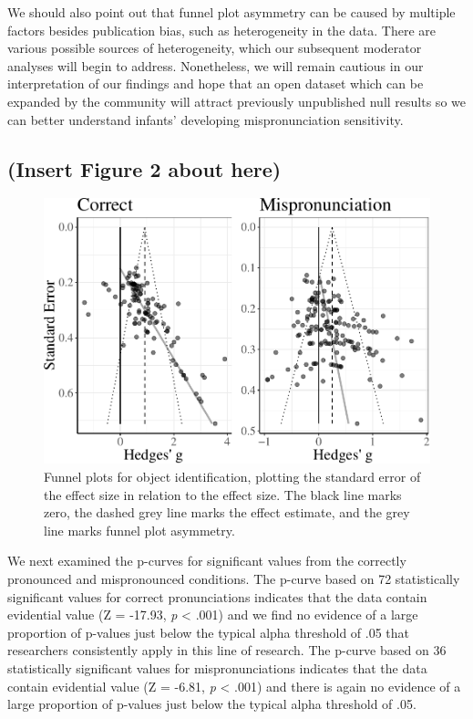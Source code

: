 \documentclass[man]{apa6}
\theoremstyle{definition}
\theoremstyle{definition}
\theoremstyle{definition}
\theoremstyle{remark}
\begin{document}
We should also point out that funnel plot asymmetry can be caused by
multiple factors besides publication bias, such as heterogeneity in the
data. There are various possible sources of heterogeneity, which our
subsequent moderator analyses will begin to address. Nonetheless, we
will remain cautious in our interpretation of our findings and hope that
an open dataset which can be expanded by the community will attract
previously unpublished null results so we can better understand infants'
developing mispronunciation sensitivity.

\subsection{(Insert Figure 2 about
here)}\label{insert-figure-2-about-here}

\begin{figure}
\centering
\includegraphics{VonHolzenBergmann_MPMetaAnalysis_files/figure-latex/FunnelCombo-1.pdf}
\caption{\label{fig:FunnelCombo}Funnel plots for object identification,
plotting the standard error of the effect size in relation to the effect
size. The black line marks zero, the dashed grey line marks the effect
estimate, and the grey line marks funnel plot asymmetry.}
\end{figure}

We next examined the p-curves for significant values from the correctly
pronounced and mispronounced conditions. The p-curve based on 72
statistically significant values for correct pronunciations indicates
that the data contain evidential value (Z = -17.93, \emph{p} \textless{}
.001) and we find no evidence of a large proportion of p-values just
below the typical alpha threshold of .05 that researchers consistently
apply in this line of research. The p-curve based on 36 statistically
significant values for mispronunciations indicates that the data contain
evidential value (Z = -6.81, \emph{p} \textless{} .001) and there is
again no evidence of a large proportion of p-values just below the
typical alpha threshold of .05.
\end{document}
